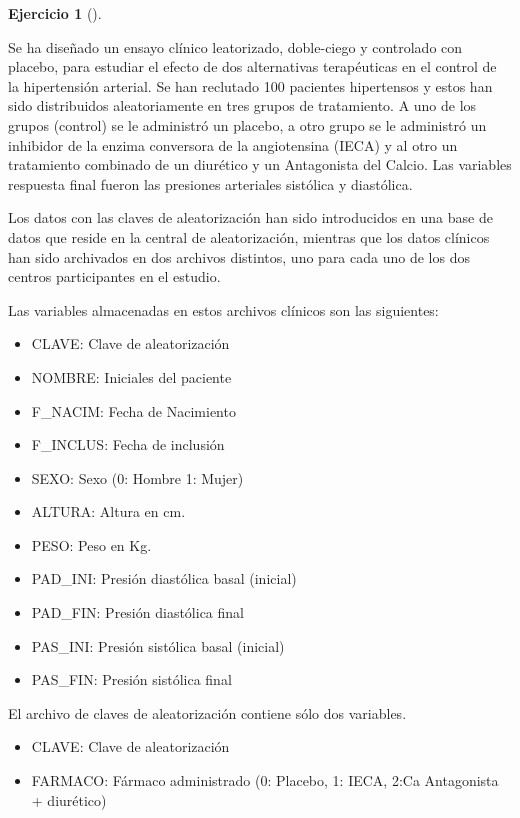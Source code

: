 \documentclass[
  a4paper,
]{scrreport}
\providecommand{\tightlist}{%
  \setlength{\itemsep}{0pt}\setlength{\parskip}{0pt}}\usepackage{longtable,booktabs,array}
\theoremstyle{definition}
\newtheorem{exercise}{Ejercicio}[chapter]
\theoremstyle{remark}
\begin{document}
\leavevmode{}%
\begin{exercise}[]\label{exr-preprocesamiento-5}

Se ha diseñado un ensayo clínico leatorizado, doble-ciego y controlado
con placebo, para estudiar el efecto de dos alternativas terapéuticas en
el control de la hipertensión arterial. Se han reclutado 100 pacientes
hipertensos y estos han sido distribuidos aleatoriamente en tres grupos
de tratamiento. A uno de los grupos (control) se le administró un
placebo, a otro grupo se le administró un inhibidor de la enzima
conversora de la angiotensina (IECA) y al otro un tratamiento combinado
de un diurético y un Antagonista del Calcio. Las variables respuesta
final fueron las presiones arteriales sistólica y diastólica.

Los datos con las claves de aleatorización han sido introducidos en una
base de datos que reside en la central de aleatorización, mientras que
los datos clínicos han sido archivados en dos archivos distintos, uno
para cada uno de los dos centros participantes en el estudio.

Las variables almacenadas en estos archivos clínicos son las siguientes:

\begin{itemize}
\tightlist
\item
  CLAVE: Clave de aleatorización
\item
  NOMBRE: Iniciales del paciente
\item
  F\_NACIM: Fecha de Nacimiento
\item
  F\_INCLUS: Fecha de inclusión
\item
  SEXO: Sexo (0: Hombre 1: Mujer)
\item
  ALTURA: Altura en cm.
\item
  PESO: Peso en Kg.
\item
  PAD\_INI: Presión diastólica basal (inicial)
\item
  PAD\_FIN: Presión diastólica final
\item
  PAS\_INI: Presión sistólica basal (inicial)
\item
  PAS\_FIN: Presión sistólica final
\end{itemize}

El archivo de claves de aleatorización contiene sólo dos variables.

\begin{itemize}
\tightlist
\item
  CLAVE: Clave de aleatorización
\item
  FARMACO: Fármaco administrado (0: Placebo, 1: IECA, 2:Ca Antagonista +
  diurético)
\end{itemize}


\end{exercise}
\end{document}

